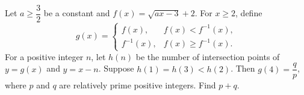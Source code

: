 Let \(a\ge\dfrac{3}{2}\) be a constant and \(f(x)=\sqrt{ax-3}+2\). For \(x\ge 2\), define
\[
g(x)=\begin{cases} f(x), & f(x)<f^{-1}(x),\\ f^{-1}(x), & f(x)\ge f^{-1}(x).\end{cases}
\]
For a positive integer \(n\), let \(h(n)\) be the number of intersection points of \(y=g(x)\) and \(y=x-n\). Suppose \(h(1)=h(3)<h(2)\). Then \(g(4)=\dfrac{q}{p}\), where \(p\) and \(q\) are relatively prime positive integers. Find \(p+q\).
